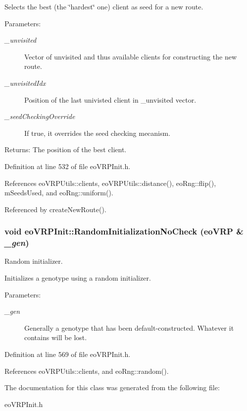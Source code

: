 Selects the best (the \char`\"{}hardest\char`\"{} one) client as seed for a new route. 

\begin{Desc}
\item[Parameters:]
\begin{description}
\item[{\em \_\-unvisited}]Vector of unvisited and thus available clients for constructing the new route. \item[{\em \_\-unvisited\-Idx}]Position of the last univisted client in \_\-unvisited vector. \item[{\em \_\-seed\-Checking\-Override}]If true, it overrides the seed checking mecanism. \end{description}
\end{Desc}
\begin{Desc}
\item[Returns:]The position of the best client. \end{Desc}


Definition at line 532 of file eo\-VRPInit.h.

References eo\-VRPUtils::clients, eo\-VRPUtils::distance(), eo\-Rng::flip(), m\-Seeds\-Used, and eo\-Rng::uniform().

Referenced by create\-New\-Route().
\subsubsection{\setlength{\rightskip}{0pt plus 5cm}void eo\-VRPInit::Random\-Initialization\-No\-Check (\bf{eo\-VRP} \& {\em \_\-gen})\hspace{0.3cm}{\tt  [inline, private]}}\label{classeo_v_r_p_init_008ae39692b67ef0b25aed89075b1d46}


Random initializer. 

Initializes a genotype using a random initializer. \begin{Desc}
\item[Parameters:]
\begin{description}
\item[{\em \_\-gen}]Generally a genotype that has been default-constructed. Whatever it contains will be lost. \end{description}
\end{Desc}


Definition at line 569 of file eo\-VRPInit.h.

References eo\-VRPUtils::clients, and eo\-Rng::random().

The documentation for this class was generated from the following file:\begin{CompactItemize}
\item 
eo\-VRPInit.h\end{CompactItemize}
